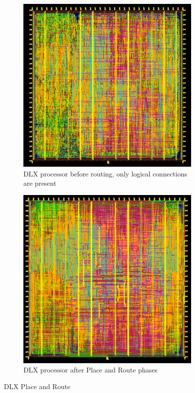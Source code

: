 \begin{figure}[h!]
    \begin{subfigure}[t]{.45\textwidth}
        \centering
        \includegraphics[width=.9\textwidth]{chapters/9_PhysicalDesign/images/pre_routing.png}
        \caption{DLX processor before routing, only logical connections are present}
        \label{fig:pre_routing}
    \end{subfigure}\hfill
    \begin{subfigure}[t]{.45\textwidth}
        \centering
        \includegraphics[width=.9\textwidth]{chapters/9_PhysicalDesign/images/phy_end.png}
        \caption{DLX processor after Place and Route phases}
        \label{fig:phy_end}
    \end{subfigure}
    \caption{DLX Place and Route}
\end{figure}

